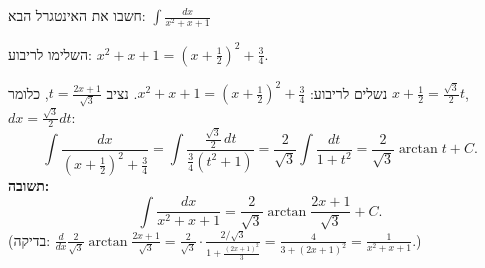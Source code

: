 
\begin{question}
חשבו את האינטגרל הבא:
$\displaystyle\int\frac{dx}{x^2+x+1}$
\end{question}

\begin{hint}
השלימו לריבוע: $x^2+x+1=\left(x+\frac12\right)^2+\frac34$.
\end{hint}

\begin{solution}
נשלים לריבוע: $x^2+x+1=\left(x+\frac12\right)^2+\frac34$. נציב $t=\frac{2x+1}{\sqrt3}$, כלומר $x+\frac12=\frac{\sqrt3}{2}t$, $dx=\frac{\sqrt3}{2}dt$:
\[
\int\frac{dx}{\left(x+\frac12\right)^2+\frac34}=\int\frac{\frac{\sqrt3}{2}\,dt}{\frac34(t^2+1)}=\frac{2}{\sqrt3}\int\frac{dt}{1+t^2}=\frac{2}{\sqrt3}\arctan t+C.
\]
\textbf{תשובה:}
\[
\int\frac{dx}{x^2+x+1}=\frac{2}{\sqrt3}\arctan\frac{2x+1}{\sqrt3}+C.
\]
(בדיקה: $\frac{d}{dx}\frac{2}{\sqrt3}\arctan\frac{2x+1}{\sqrt3}=\frac{2}{\sqrt3}\cdot\frac{2/\sqrt3}{1+\frac{(2x+1)^2}{3}}=\frac{4}{3+(2x+1)^2}=\frac{1}{x^2+x+1}$.)
\end{solution}

